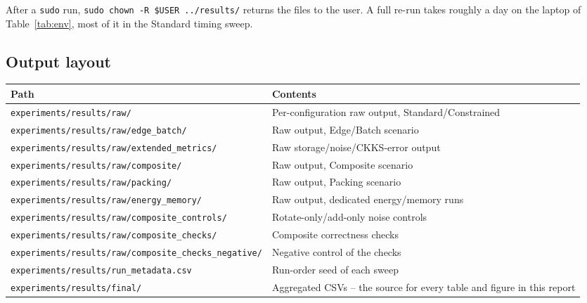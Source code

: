 After a \texttt{sudo} run, \texttt{sudo chown -R \$USER ../results/} returns the files to the user. A full re-run takes roughly a day on the laptop of Table~\ref{tab:env}, most of it in the Standard timing sweep.

\subsection{Output layout}

\begin{center}
\small
\begin{tabular}{@{}>{\raggedright\arraybackslash}p{6.6cm}>{\raggedright\arraybackslash}p{7.6cm}@{}}
\toprule
\textbf{Path} & \textbf{Contents} \\
\midrule
\nolinkurl{experiments/results/raw/} & Per-configuration raw output, Standard/Constrained \\
\nolinkurl{experiments/results/raw/edge_batch/} & Raw output, Edge/Batch scenario \\
\nolinkurl{experiments/results/raw/extended_metrics/} & Raw storage/noise/CKKS-error output \\
\nolinkurl{experiments/results/raw/composite/} & Raw output, Composite scenario \\
\nolinkurl{experiments/results/raw/packing/} & Raw output, Packing scenario \\
\nolinkurl{experiments/results/raw/energy_memory/} & Raw output, dedicated energy/memory runs \\
\nolinkurl{experiments/results/raw/composite_controls/} & Rotate-only/add-only noise controls \\
\nolinkurl{experiments/results/raw/composite_checks/} & Composite correctness checks \\
\nolinkurl{experiments/results/raw/composite_checks_negative/} & Negative control of the checks \\
\nolinkurl{experiments/results/run_metadata.csv} & Run-order seed of each sweep \\
\nolinkurl{experiments/results/final/} & Aggregated CSVs -- the source for every table and figure in this report \\
\bottomrule
\end{tabular}
\end{center}
